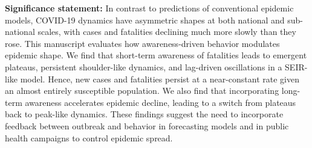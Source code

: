 \begin{boxit}
\noindent
\textbf{Significance statement:}
In contrast to predictions of conventional epidemic models,
COVID-19 dynamics have asymmetric shapes at both national
and sub-national scales, with cases and fatalities 
declining much more slowly than they rose. 
This manuscript evaluates how awareness-driven
behavior modulates epidemic shape.
We find that short-term awareness of fatalities leads 
to emergent plateaus, persistent shoulder-like dynamics, and lag-driven
oscillations in a SEIR-like model.  
Hence, new cases and fatalities persist at 
a near-constant rate given an almost entirely susceptible population.
We also find that incorporating long-term awareness 
accelerates epidemic decline, leading to a switch from plateaus back to peak-like dynamics. 
These findings suggest the need to incorporate feedback
between outbreak and behavior in forecasting models and in public
health campaigns to control epidemic spread.
\end{boxit}
